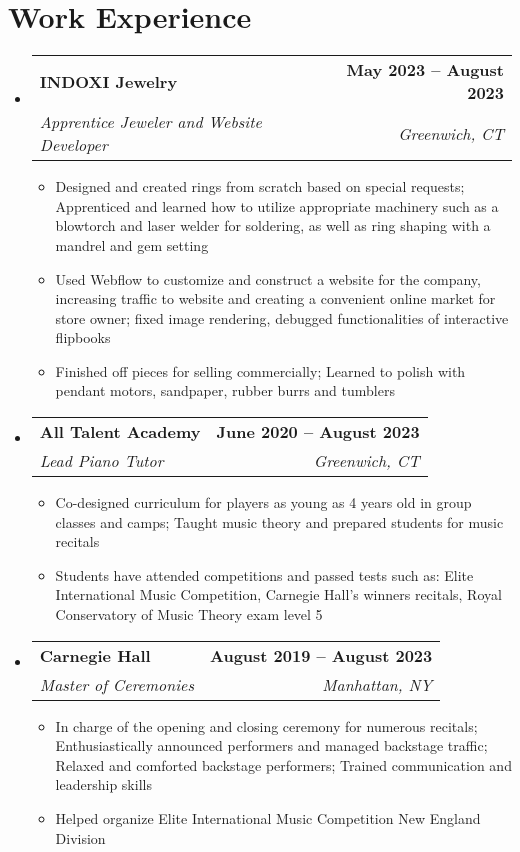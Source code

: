 \documentclass[letterpaper,11pt]{article}
\makeatletter
\newcommand{\resumeItem}[1]{
  \item\small{
    {#1 \vspace{-2pt}}
  }
}
\newcommand{\resumeSubheading}[4]{
  \vspace{-2pt}\item
    \begin{tabular*}{1.0\textwidth}[t]{l@{\extracolsep{\fill}}r}
      \textbf{#1} & \textbf{\small #2} \\
      \textit{\small#3} & \textit{\small #4} \\
    \end{tabular*}\vspace{-7pt}
}
\newcommand{\resumeSubHeadingListStart}{\begin{itemize}[leftmargin=0.0in, label={}]}
\newcommand{\resumeSubHeadingListEnd}{\end{itemize}}
\newcommand{\resumeItemListStart}{\begin{itemize}}
\newcommand{\resumeItemListEnd}{\end{itemize}\vspace{-5pt}}
\makeatother
\begin{document}
\section{Work Experience}
  \resumeSubHeadingListStart

    \resumeSubheading
      {INDOXI Jewelry}{May 2023 -- August 2023}
      {Apprentice Jeweler and Website Developer}{Greenwich, CT}
      \resumeItemListStart
        \resumeItem{Designed and created rings from scratch based on special requests; Apprenticed and learned how to utilize appropriate machinery such as a blowtorch and laser welder for soldering, as well as ring shaping with a mandrel and gem setting}
        \resumeItem{Used Webflow to customize and construct a website for the company, increasing traffic to website and creating a convenient online market for store owner; fixed image rendering, debugged functionalities of interactive flipbooks}
        \resumeItem{Finished off pieces for selling commercially; Learned to polish with pendant motors, sandpaper, rubber burrs and tumblers}
      \resumeItemListEnd

    \resumeSubheading
      {All Talent Academy}{June 2020 -- August 2023}
      {Lead Piano Tutor}{Greenwich, CT}
      \resumeItemListStart
        \resumeItem{Co-designed curriculum for players as young as 4 years old in group classes and camps; Taught music theory and prepared students for music recitals}
        \resumeItem{Students have attended competitions and passed tests such as: Elite International Music Competition,
        Carnegie Hall's winners recitals, Royal Conservatory of Music Theory exam level 5}
    \resumeItemListEnd

    \resumeSubheading
      {Carnegie Hall}{August 2019 -- August 2023}
      {Master of Ceremonies}{Manhattan, NY}
      \resumeItemListStart
        \resumeItem{In charge of the opening and closing ceremony for numerous recitals; Enthusiastically announced performers and managed backstage traffic; Relaxed and comforted backstage performers; Trained communication and leadership skills}
        \resumeItem{Helped organize Elite International Music Competition New England Division}
    \resumeItemListEnd
    
  \resumeSubHeadingListEnd
\vspace{-16pt}

\end{document}
